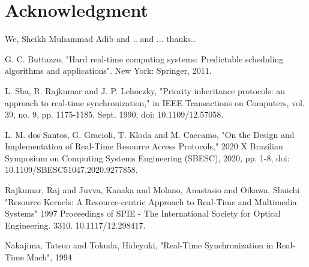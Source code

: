 \documentclass[conference]{IEEEtran}
\begin{document}
\section*{Acknowledgment}

We, Sheikh Muhammad Adib  and .. and ... thanks..

\begin{thebibliography}{00}
 G. C. Buttazzo, "Hard real-time computing systems: Predictable scheduling algorithms and applications". New York: Springer, 2011. 

 L. Sha, R. Rajkumar and J. P. Lehoczky, "Priority inheritance protocols: an approach to real-time synchronization," in IEEE Transactions on Computers, vol. 39, no. 9, pp. 1175-1185, Sept. 1990, doi: 10.1109/12.57058.

 L. M. dos Santos, G. Gracioli, T. Kloda and M. Caccamo, "On the Design and Implementation of Real-Time Resource Access Protocols," 2020 X Brazilian Symposium on Computing Systems Engineering (SBESC), 2020, pp. 1-8, doi: 10.1109/SBESC51047.2020.9277858.

 Rajkumar, Raj and Juvva, Kanaka and Molano, Anastasio and Oikawa, Shuichi "Resource Kernels: A Resource-centric Approach to Real-Time and Multimedia Systems" 1997 Proceedings of SPIE - The International Society for Optical Engineering. 3310. 10.1117/12.298417. 

 Nakajima, Tatsuo and Tokuda, Hideyuki, "Real-Time Synchronization in Real-Time Mach", 1994 
\end{thebibliography}
\end{document}
